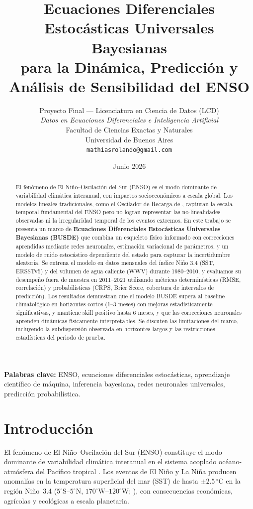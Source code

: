 \documentclass[11pt,a4paper]{article}
\title{%
  \textbf{Ecuaciones Diferenciales Estocásticas Universales Bayesianas\\
  para la Dinámica, Predicción y Análisis de Sensibilidad del ENSO}
}
\author{%
  Proyecto Final --- Licenciatura en Ciencia de Datos (LCD)\\
  \textit{Datos en Ecuaciones Diferenciales e Inteligencia Artificial}\\[2mm]
  Facultad de Ciencias Exactas y Naturales\\
  Universidad de Buenos Aires\\[2mm]
  \texttt{mathiasrolando@gmail.com}
}
\date{Junio 2026}
\begin{document}
\maketitle

\begin{abstract}
El fenómeno de El Niño--Oscilación del Sur (ENSO) es el modo dominante de variabilidad climática interanual, con impactos socioeconómicos a escala global. Los modelos lineales tradicionales, como el Oscilador de Recarga de \citet{jin1997}, capturan la escala temporal fundamental del ENSO pero no logran representar las no-linealidades observadas ni la irregularidad temporal de los eventos extremos. En este trabajo se presenta un marco de \textbf{Ecuaciones Diferenciales Estocásticas Universales Bayesianas (BUSDE)} que combina un esqueleto físico informado con correcciones aprendidas mediante redes neuronales, estimación variacional de parámetros, y un modelo de ruido estocástico dependiente del estado para capturar la incertidumbre aleatoria. Se entrena el modelo en datos mensuales del índice Niño 3.4 (SST, ERSSTv5) y del volumen de agua caliente (WWV) durante 1980--2010, y evaluamos su desempeño fuera de muestra en 2011--2021 utilizando métricas determinísticas (RMSE, correlación) y probabilísticas (CRPS, Brier Score, cobertura de intervalos de predicción). Los resultados demuestran que el modelo BUSDE supera al baseline climatológico en horizontes cortos (1–3 meses) con mejoras estadísticamente significativas, y mantiene skill positivo hasta 6 meses, y que las correcciones neuronales aprenden dinámicas físicamente interpretables. Se discuten las limitaciones del marco, incluyendo la subdispersión observada en horizontes largos y las restricciones estadísticas del periodo de prueba.
\end{abstract}

\vspace{3mm}
\noindent\textbf{Palabras clave:} ENSO, ecuaciones diferenciales estocásticas, aprendizaje científico de máquina, inferencia bayesiana, redes neuronales universales, predicción probabilística.

\section{Introducción}
\label{sec:introduccion}

El fenómeno de El Niño--Oscilación del Sur (ENSO) constituye el modo dominante de variabilidad climática interanual en el sistema acoplado océano-atmósfera del Pacífico tropical \citep{mcphaden2006}. Los eventos de El Niño y La Niña producen anomalías en la temperatura superficial del mar (SST) de hasta $\pm 2.5\,^{\circ}\mathrm{C}$ en la región Niño~3.4 ($5^{\circ}\mathrm{S}$--$5^{\circ}\mathrm{N}$, $170^{\circ}\mathrm{W}$--$120^{\circ}\mathrm{W}$; \citealt{trenberth1997}), con consecuencias económicas, agrícolas y ecológicas a escala planetaria.
\end{document}
